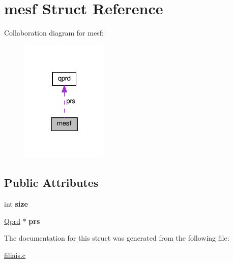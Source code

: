 \hypertarget{structmesf}{}\section{mesf Struct Reference}
\label{structmesf}


Collaboration diagram for mesf\+:
\nopagebreak
\begin{figure}[H]
\begin{center}
\leavevmode
\includegraphics[width=118pt]{structmesf__coll__graph}
\end{center}
\end{figure}
\subsection*{Public Attributes}
\begin{DoxyCompactItemize}
\item 
\mbox{\label{structmesf_a719adfb67149cf6a5f2336d4f9c32099}} 
int {\bfseries size}
\item 
\mbox{\label{structmesf_a67f98166aa2c830b4ca93ff63751a8c3}} 
\hyperlink{structqprd}{Qprd} $\ast$ {\bfseries prs}
\end{DoxyCompactItemize}


The documentation for this struct was generated from the following file\+:\begin{DoxyCompactItemize}
\item 
\hyperlink{filiais_8c}{filiais.\+c}\end{DoxyCompactItemize}
